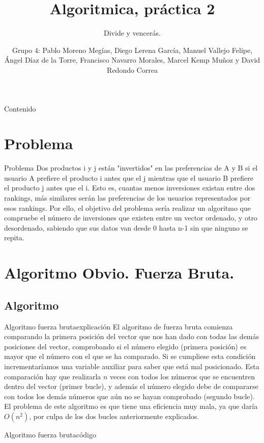 \documentclass{beamer}
\title{Algoritmica, práctica 2}
\subtitle{Divide y vencerás.}
\author{Grupo 4: Pablo Moreno Megías, Diego Lerena García, Manuel Vallejo Felipe, Ángel Díaz de la Torre, Francisco Navarro Morales, Marcel Kemp Muñoz y David Redondo Correa}
\institute[Universidad de Granada.] %
{
	Segundo curso del Grado de Ingeniería Informática.\\
		curso 2016-2017.
}
\begin{document}
	
	
	
	\begin{frame}
		\titlepage
	\end{frame}
	
	\begin{frame}{Contenido}
		\tableofcontents
	\end{frame}


\section{Problema}

	
\begin{frame}{Problema}
		Dos productos i y j están "invertidos" en las preferencias de A y B si el usuario
		A prefiere el producto i antes que el j mientras que el usuario B prefiere el
		producto j antes que el i.
		Esto es, cuantas menos inversiones existan entre dos rankings, más similares
		serán las preferencias de los usuarios representados por esos rankings.
		Por ello, el objetivo del problema sería realizar un algoritmo que compruebe el
		número de inversiones que existen entre un vector ordenado, y otro desordenado, sabiendo
		que sus datos van desde 0 hasta n-1 sin que ninguno se repita.
\end{frame}

\section{Algoritmo Obvio. Fuerza Bruta.}
\subsection{Algoritmo}


\begin{frame}{Algoritmo fuerza bruta}{explicación}
El algoritmo de fuerza bruta comienza comparando la primera posición del vector que nos han dado con todas las demás posiciones del vector, comprobando si el número elegido (primera posición) es mayor que el número con el que se ha comparado. Si se cumpliese esta condición incrementaríamos una variable auxiliar para saber que está mal posicionado. Esta comparación hay que realizarla $n$ veces con todos los números que se encuentren dentro del vector (primer bucle), y además el número elegido debe de compararse con todos los demás números que aún no se hayan comprobado (segundo bucle). El problema de este algoritmo es que tiene una eficiencia muy mala, ya que daría $O(n^2)$, por culpa de los dos bucles anteriormente explicados.

\end{frame}
\begin{frame}{Algoritmo fuerza bruta}{código}
	
\end{frame}
\end{document}
